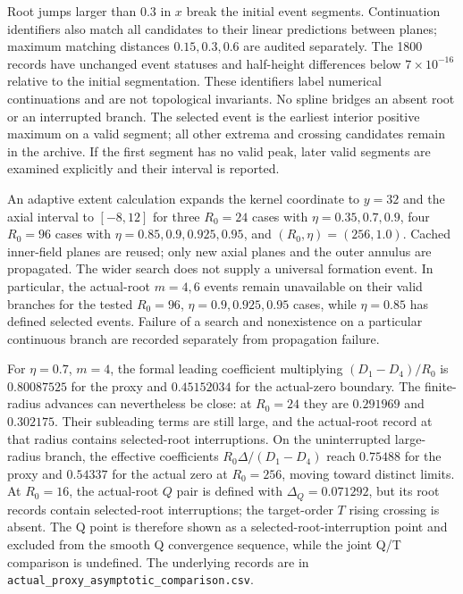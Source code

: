 Root jumps larger than $0.3$ in $x$ break the initial event segments.
Continuation identifiers also match all candidates to their linear
predictions between planes; maximum matching distances $0.15,0.3,0.6$
are audited separately. The 1800 records have unchanged event statuses
and half-height differences below $7\times10^{-16}$ relative to the
initial segmentation. These identifiers label numerical continuations and are not
topological invariants. No spline bridges an absent root or an interrupted
branch. The selected event is the earliest interior positive maximum on
a valid segment; all other extrema and crossing candidates remain in the
archive. If the first segment has no valid peak, later valid segments
are examined explicitly and their interval is reported.

An adaptive extent calculation expands the kernel coordinate to $y=32$
and the axial interval to $[-8,12]$ for
three $R_0=24$ cases with $\eta=0.35,0.7,0.9$, four $R_0=96$
cases with $\eta=0.85,0.9,0.925,0.95$, and $(R_0,\eta)=(256,1.0)$.
Cached inner-field planes are reused;
only new axial planes and the outer annulus are propagated. The wider
search does not supply a universal formation event. In particular,
the actual-root $m=4,6$ events remain unavailable on their valid branches
for the tested $R_0=96$, $\eta=0.9,0.925,0.95$ cases, while
$\eta=0.85$ has defined selected events. Failure of a search and
nonexistence on a particular continuous branch are recorded separately
from propagation failure.

For $\eta=0.7$, $m=4$, the formal leading coefficient multiplying
$(D_1-D_4)/R_0$ is $0.80087525$ for the proxy and $0.45152034$ for the
actual-zero boundary. The finite-radius advances can nevertheless be close:
at $R_0=24$ they are $0.291969$ and $0.302175$. Their subleading terms are
still large, and the actual-root record at that radius contains selected-root interruptions.
On the uninterrupted large-radius branch, the effective coefficients
$R_0\Delta/(D_1-D_4)$ reach $0.75488$ for the proxy and $0.54337$ for
the actual zero at $R_0=256$, moving toward distinct limits. At $R_0=16$,
the actual-root $Q$ pair is defined with $\Delta_Q=0.071292$, but its root
records contain selected-root interruptions; the target-order $T$ rising crossing is absent.
The Q point is therefore shown as a selected-root-interruption point and excluded from the
smooth Q convergence sequence, while the joint Q/T comparison is undefined.
The underlying records are in
\texttt{actual\_proxy\_asymptotic\_comparison.csv}.


